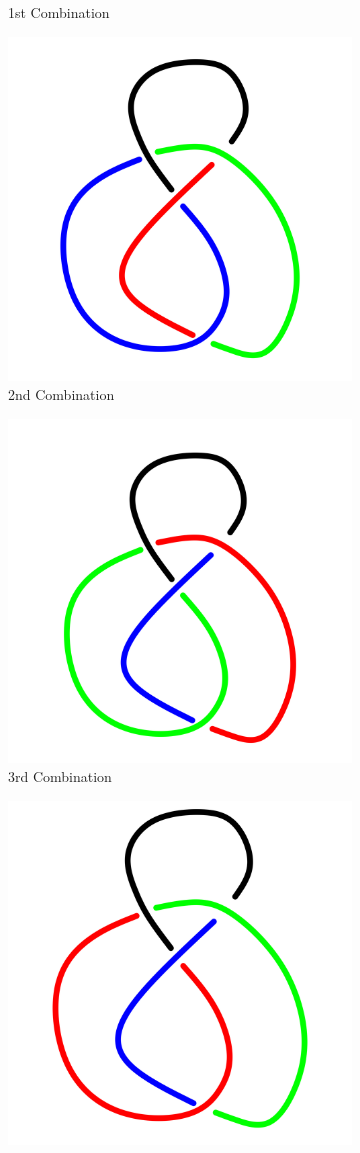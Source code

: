 \documentclass[a4paper,9pt]{article}
\begin{document}
\begin{enumerate}
\begin{figure}[h!]
\begin{subfigure}[b]{0.25\linewidth}
		\caption{1st Combination}
	\end{subfigure}
	\qquad
	\begin{subfigure}[b]{0.25\linewidth}
		\centering
		\includegraphics[width=0.5\linewidth]{picture/knotpict/knot-2}
		\caption{2nd Combination}
	\end{subfigure}
	\qquad
	\begin{subfigure}[b]{0.25\linewidth}
		\centering
		\includegraphics[width=0.5\linewidth]{picture/knotpict/knot-3}
		\caption{3rd Combination}
	\end{subfigure}
	\qquad
	\begin{subfigure}[b]{0.25\linewidth}
		\centering
		\includegraphics[width=0.5\linewidth]{picture/knotpict/knot-4}

\end{subfigure}
\end{figure}
\end{enumerate}
\end{document}
